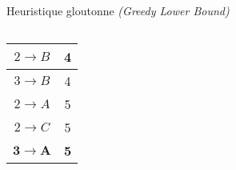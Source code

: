 \begin{frame}{Heuristique gloutonne \textit{(Greedy Lower Bound)}}
{\begin{columns}[onlytextwidth]
\begin{column}{0.4\textwidth}
\begin{tabular}{ | c | c | }
                            \hline
                            $2 \rightarrow B$ & 4 \\
                            \hline
                            $3 \rightarrow B$ & 4 \\
                            \hline
                            $2 \rightarrow A$ & 5 \\
                            \hline
                            $2 \rightarrow C$ & 5 \\
                            \hline
                            $\mathbf{3 \rightarrow A}$ & \textbf{5} \\
                            \hline
                        \end{tabular}
                    \end{column}
                \end{columns}
            }
        \end{frame}

